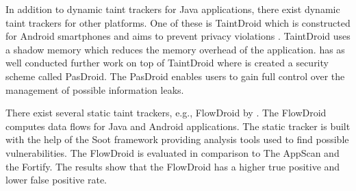 In addition to dynamic taint trackers for Java applications, there exist dynamic taint trackers for other platforms. One of these is TaintDroid which is constructed for Android smartphones and aims to prevent privacy violations \parencite{EnckWilliam2014Taif}. TaintDroid uses a shadow memory which reduces the memory overhead of the application. \textcite{HsiaoS.W.2014PRse} has as well conducted further work on top of TaintDroid where is created a security scheme called PasDroid. The PasDroid enables users to gain full control over the management of possible information leaks.

There exist several static taint trackers, e.g., FlowDroid by \textcite{ArztS.2014FPcf}. The FlowDroid computes data flows for Java and Android applications. The static tracker is built with the help of the Soot framework \parencite{soot} providing analysis tools used to find possible vulnerabilities. The FlowDroid is evaluated in comparison to The AppScan and the Fortify. The results show that the FlowDroid has a higher true positive and lower false positive rate.